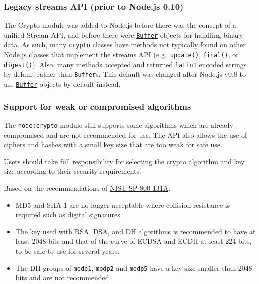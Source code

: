 \subsubsection{Legacy streams API (prior to Node.js
0.10)}\label{legacy-streams-api-prior-to-node.js-0.10}

The Crypto module was added to Node.js before there was the concept of a
unified Stream API, and before there were
\href{buffer.md}{\texttt{Buffer}} objects for handling binary data. As
such, many \texttt{crypto} classes have methods not typically found on
other Node.js classes that implement the \href{stream.md}{streams} API
(e.g.~\texttt{update()}, \texttt{final()}, or \texttt{digest()}). Also,
many methods accepted and returned
\texttt{\textquotesingle{}latin1\textquotesingle{}} encoded strings by
default rather than \texttt{Buffer}s. This default was changed after
Node.js v0.8 to use \href{buffer.md}{\texttt{Buffer}} objects by default
instead.

\subsubsection{Support for weak or compromised
algorithms}\label{support-for-weak-or-compromised-algorithms}

The \texttt{node:crypto} module still supports some algorithms which are
already compromised and are not recommended for use. The API also allows
the use of ciphers and hashes with a small key size that are too weak
for safe use.

Users should take full responsibility for selecting the crypto algorithm
and key size according to their security requirements.

Based on the recommendations of
\href{https://nvlpubs.nist.gov/nistpubs/SpecialPublications/NIST.SP.800-131Ar2.pdf}{NIST
SP 800-131A}:

\begin{itemize}
\tightlist
\item
  MD5 and SHA-1 are no longer acceptable where collision resistance is
  required such as digital signatures.
\item
  The key used with RSA, DSA, and DH algorithms is recommended to have
  at least 2048 bits and that of the curve of ECDSA and ECDH at least
  224 bits, to be safe to use for several years.
\item
  The DH groups of \texttt{modp1}, \texttt{modp2} and \texttt{modp5}
  have a key size smaller than 2048 bits and are not recommended.
\end{itemize}


